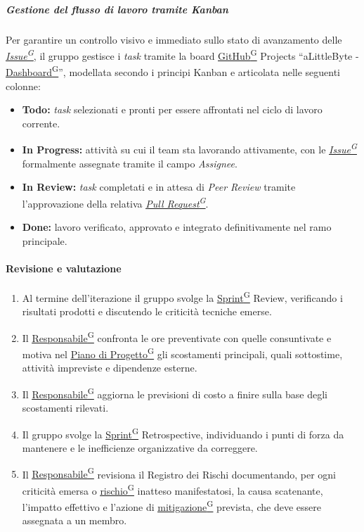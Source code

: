 \documentclass[a4paper,12pt]{article}
\providecommand{\glslink}[2]{\href{https://alittlebyte-19.github.io/Documentazione/glossario.html\#gls-#1}{\underline{#2}\textsuperscript{\scriptsize G}}}
\begin{document}
\subparagraph{Gestione del flusso di lavoro tramite Kanban}
Per garantire un controllo visivo e immediato sullo stato di avanzamento delle \textit{\glslink{issue}{Issue}}, il gruppo gestisce i \textit{task} tramite la board \glslink{github}{GitHub} Projects ``aLittleByte - \glslink{dashboard}{Dashboard}'', modellata secondo i principi Kanban e articolata nelle seguenti colonne:
\begin{itemize}
    \item \textbf{Todo:} \textit{task} selezionati e pronti per essere affrontati nel ciclo di lavoro corrente.
    \item \textbf{In Progress:} attività su cui il team sta lavorando attivamente, con le \textit{\glslink{issue}{Issue}} formalmente assegnate tramite il campo \textit{Assignee}.
    \item \textbf{In Review:} \textit{task} completati e in attesa di \textit{Peer Review} tramite l'approvazione della relativa \textit{\glslink{pull-request}{Pull Request}}.
    \item \textbf{Done:} lavoro verificato, approvato e integrato definitivamente nel ramo principale.
\end{itemize}

\paragraph{Revisione e valutazione}
\begin{enumerate}
    \item Al termine dell'iterazione il gruppo svolge la \glslink{sprint}{Sprint} Review, verificando i risultati prodotti e discutendo le criticità tecniche emerse.
    \item Il \glslink{responsabile}{Responsabile} confronta le ore preventivate con quelle consuntivate e motiva nel \glslink{piano-di-progetto}{Piano di Progetto} gli scostamenti principali, quali sottostime, attività impreviste e dipendenze esterne.
    \item Il \glslink{responsabile}{Responsabile} aggiorna le previsioni di costo a finire sulla base degli scostamenti rilevati.
    \item Il gruppo svolge la \glslink{sprint}{Sprint} Retrospective, individuando i punti di forza da mantenere e le inefficienze organizzative da correggere.
    \item Il \glslink{responsabile}{Responsabile} revisiona il Registro dei Rischi documentando, per ogni criticità emersa o \glslink{rischio}{rischio} inatteso manifestatosi, la causa scatenante, l'impatto effettivo e l'azione di \glslink{mitigazione-dei-rischi}{mitigazione} prevista, che deve essere assegnata a un membro.
\end{enumerate}
\end{document}
